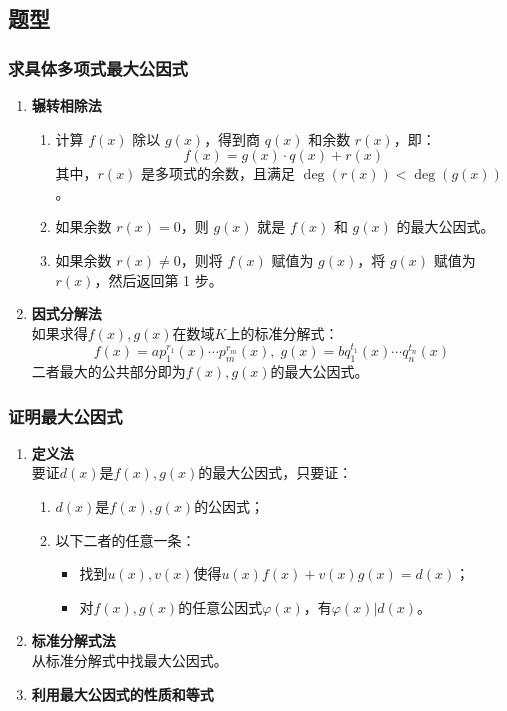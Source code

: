 \subsection{题型}
\subsubsection{求具体多项式最大公因式}
\begin{enumerate}
	\item \textbf{辗转相除法}
	\begin{enumerate}
		\item 计算 \( f(x) \) 除以 \( g(x) \)，得到商 \( q(x) \) 和余数 \( r(x) \)，即：
		\[
		f(x) = g(x) \cdot q(x) + r(x)
		\]
		其中，\( r(x) \) 是多项式的余数，且满足 \( \deg(r(x)) < \deg(g(x)) \)。
		
		\item 如果余数 \( r(x) = 0 \)，则 \( g(x) \) 就是 \( f(x) \) 和 \( g(x) \) 的最大公因式。
		
		\item 如果余数 \( r(x) \neq 0 \)，则将 \( f(x) \) 赋值为 \( g(x) \)，将 \( g(x) \) 赋值为 \( r(x) \)，然后返回第 1 步。
	\end{enumerate}
	\item \textbf{因式分解法} \\
	如果求得$f(x),g(x)$在数域$K$上的标准分解式：
	\begin{equation*}
		f(x)=ap_1^{r_1}(x)\cdots p_m^{r_m}(x),\;
		g(x)=bq_1^{t_1}(x)\cdots q_n^{t_n}(x)
	\end{equation*}
	二者最大的公共部分即为$f(x),g(x)$的最大公因式。
\end{enumerate}
\subsubsection{证明最大公因式}
\begin{enumerate}
	\item \textbf{定义法} \\
	要证$d(x)$是$f(x),g(x)$的最大公因式，只要证：
	\begin{enumerate}
		\item $d(x)$是$f(x),g(x)$的公因式；
		\item 以下二者的任意一条：
		\begin{itemize}
			\item 找到$u(x),v(x)$使得$u(x)f(x)+v(x)g(x)=d(x)$；
			\item 对$f(x),g(x)$的任意公因式$\varphi(x)$，有$\varphi(x)|d(x)$。
		\end{itemize}
	\end{enumerate}
	\item \textbf{标准分解式法} \\
	从标准分解式中找最大公因式。
	\item \textbf{利用最大公因式的性质和等式}
\end{enumerate}
